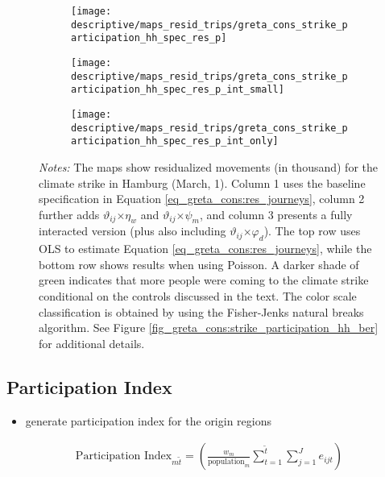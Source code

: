 {\begin{landscape}
\begin{figure}[H]
			\begin{subfigure}[h]{0.22\linewidth}\centering
				\texttt{[image: descriptive/maps\_resid\_trips/greta\_cons\_strike\_participation\_hh\_spec\_res\_p]}
			\end{subfigure}
			\begin{subfigure}[h]{0.22\linewidth}\centering
				\texttt{[image: descriptive/maps\_resid\_trips/greta\_cons\_strike\_participation\_hh\_spec\_res\_p\_int\_small]}
			\end{subfigure}
			\begin{subfigure}[h]{0.22\linewidth}\centering
				\texttt{[image: descriptive/maps\_resid\_trips/greta\_cons\_strike\_participation\_hh\_spec\_res\_p\_int\_only]}
			\end{subfigure}
			\begin{minipage}{0.9\linewidth}
				\scriptsize{\emph{Notes:} The maps show residualized movements (in thousand) for the climate strike in Hamburg (March, 1). Column 1 uses the baseline specification in Equation \ref{eq_greta_cons:res_journeys}, column 2 further adds $\vartheta_{ij}$$\times\eta_w$ and  $\vartheta_{ij}$$\times\psi_m$, and column 3 presents a fully interacted version (plus also including $\vartheta_{ij}$$\times\varphi_d$). The top row uses OLS to estimate Equation \ref{eq_greta_cons:res_journeys}, while the bottom row shows results when using Poisson. A darker shade of green indicates that more people were coming to the climate strike conditional on the controls discussed in the text. The color scale classification is obtained by using the Fisher-Jenks natural breaks algorithm. See Figure \ref{fig_greta_cons:strike_participation_hh_ber} for additional details.}
			\end{minipage}
		\end{figure}
		\vspace*{\fill}\clearpage
	\end{landscape}
	\restoregeometry
}







\subsection{Participation Index}
	
\begin{itemize}	
	\item generate participation index for the origin regions
\end{itemize}
\begin{align}
	\text{Participation Index}_{m\tilde{t}} = \left( \frac{w_{m}}{\text{population}_{m}} \sum\limits_{t=1}^{\tilde{t}}\sum\limits_{j=1}^{J} e_{ijt}\right) \label{eq_greta_cons:participation_index}
\end{align}

